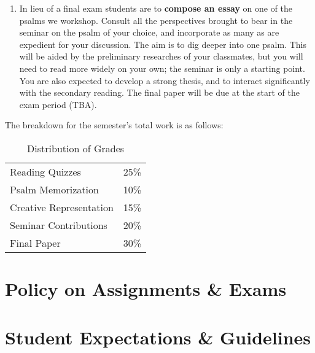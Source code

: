 \documentclass[titlepage]{article}
\newcommand\policy{../policy}
\begin{document}
\begin{enumerate}
\begin{enumerate}
	\end{enumerate}
 \item In lieu of a final exam students are to \textbf{compose an essay}
	   on one of the psalms we workshop. Consult all the perspectives
	   brought to bear in the seminar on the psalm of your choice, and
	   incorporate as many as are expedient for your discussion. The aim
	   is to dig deeper into one psalm. This will be aided by the
	   preliminary researches of your classmates, but you will need to
	   read more widely on your own; the seminar is only a starting
	   point. You are also expected to develop a strong thesis, and to
	   interact significantly with the secondary reading. The final
	   paper will be due at the start of the exam period (TBA).

\end{enumerate}

The breakdown for the semester's total work is as follows:

\begin{table}[htbp]
  \centering
  \begin{tabular}{lr}
    \toprule
    Reading Quizzes         & 25\% \\
    Psalm Memorization      & 10\% \\
    Creative Representation & 15\% \\
    Seminar Contributions   & 20\% \\
    Final Paper             & 30\% \\
    \bottomrule
  \end{tabular}
  \caption{Distribution of Grades}
  \label{distribution}
\end{table}



\section{Policy on Assignments \& Exams}
\label{policy}



%

\section{Student Expectations \& Guidelines}
\label{expectations}




\end{document}
